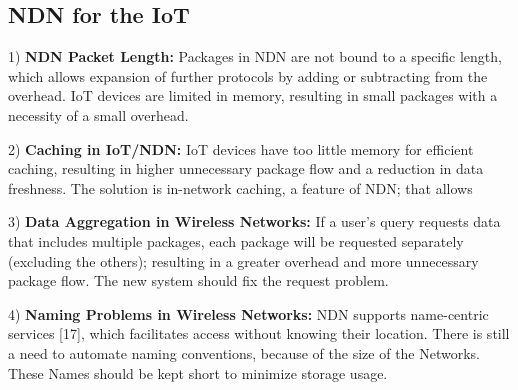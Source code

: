 \documentclass[conference]{IEEEtran}
\begin{document}

\subsection{NDN for the IoT}

1) \textbf{NDN Packet Length:}
Packages in NDN are not bound to a specific length, 
which allows expansion of further protocols by adding or subtracting from the overhead.
IoT devices are limited in memory, resulting in small packages with a necessity of a small overhead.




2) \textbf{Caching in IoT/NDN:}
IoT devices have too little memory for efficient caching, resulting in 
higher unnecessary package flow and a reduction in data freshness.
The solution is in-network caching, a feature of NDN; that allows 



3) \textbf{Data Aggregation in Wireless Networks:}
If a user's query requests data that includes multiple packages, 
each package will be requested separately (excluding the others); 
resulting in a greater overhead and more unnecessary package flow. 
The new system should fix the request problem.

4) \textbf{Naming Problems in Wireless Networks:}
NDN supports name-centric services [17], which facilitates access without knowing their location. There is still a need to automate naming conventions, because of the size of the Networks. These Names should be kept short to minimize storage usage. 
\end{document}
